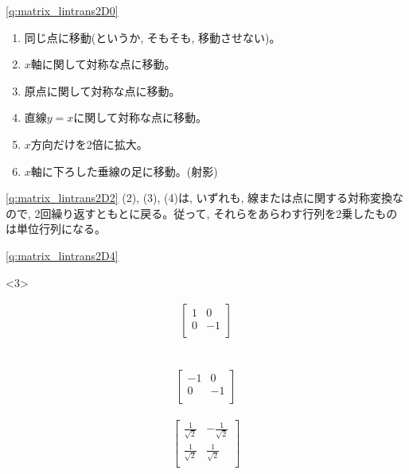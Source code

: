 \ref{q:matrix_lintrans2D0}  
\begin{enumerate}
\item 同じ点に移動(というか, そもそも, 移動させない)。
\item $x$軸に関して対称な点に移動。
\item 原点に関して対称な点に移動。 
\item 直線$y=x$に関して対称な点に移動。
\item $x$方向だけを2倍に拡大。
\item $x$軸に下ろした垂線の足に移動。(射影)
\end{enumerate}
\mv

%
\ref{q:matrix_lintrans2D2}  (2), (3), (4)は, いずれも, 線または点に関する対称変換なので, 
2回繰り返すともとに戻る。従って, それらをあらわす行列を2乗したもの
は単位行列になる。
\mv

%
\ref{q:matrix_lintrans2D4}  
\begin{edaenumerate}<3>
\item \begin{eqnarray*}\begin{bmatrix}
1 & 0 \\
0 & -1 \\\end{bmatrix}\end{eqnarray*}
\item　\begin{eqnarray*}\begin{bmatrix}
-1 & 0 \\
0 & -1 \\
\end{bmatrix}\end{eqnarray*}
\item \begin{eqnarray*}\begin{bmatrix}
\frac{1}{\sqrt{2}} & -\frac{1}{\sqrt{2}} \\
\frac{1}{\sqrt{2}} & \frac{1}{\sqrt{2}} \\
\end{bmatrix}\end{eqnarray*}
\end{edaenumerate}
\mv

